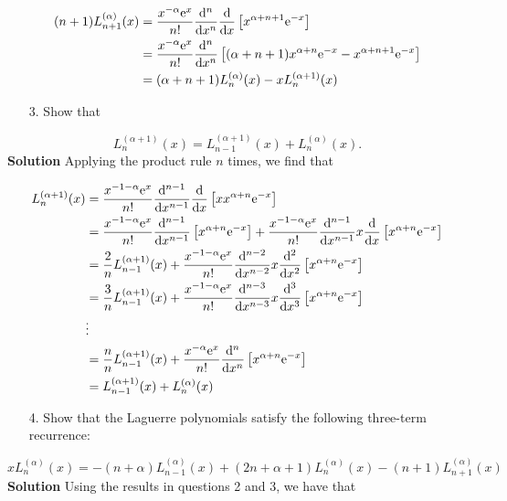 \documentclass[12pt,a4paper]{article}
\begin{document}
\begin{align*}
(n+1) L_{n+1}^{(\alpha)}(x) &= {x^{-\alpha}{\rm e}^x \over n!} {{\rm d}^{n} \over {\rm d} x^{n}} {{\rm d} \over {\rm d} x} \left[x^{\alpha+n+1} {\rm e}^{-x}\right] \\
  &= {x^{-\alpha}{\rm e}^x \over n!} {{\rm d}^{n} \over {\rm d} x^{n}}  \left[(\alpha+n+1)x^{\alpha+n} {\rm e}^{-x}-x^{\alpha+n+1} {\rm e}^{-x}\right]  \\
    &= (\alpha+n+1)L_n^{(\alpha)}(x) -   xL_n^{(\alpha+1)}(x)
\end{align*}
\begin{itemize}
\item[3. ] Show that 

\end{itemize}
\[
L_{n}^{(\alpha+1)}(x) = L_{n-1}^{(\alpha+1)}(x) + L_n^{(\alpha)}(x).
\]
\textbf{Solution} Applying the product rule $n$ times, we find that


\begin{align*}
L_{n}^{(\alpha+1)}(x) &= {x^{-1-\alpha}{\rm e}^x \over n!} {{\rm d}^{n-1} \over {\rm d} x^{n-1}} {{\rm d} \over {\rm d} x} \left[x x^{\alpha+n} {\rm e}^{-x}\right] \\
&= {x^{-1-\alpha}{\rm e}^x \over n!} {{\rm d}^{n-1} \over {\rm d} x^{n-1}} \left[ x^{\alpha+n} {\rm e}^{-x}\right]  + {x^{-1-\alpha}{\rm e}^x \over n!} {{\rm d}^{n-1} \over {\rm d} x^{n-1}} x {{\rm d} \over {\rm d} x} \left[ x^{\alpha+n} {\rm e}^{-x}\right]  \\
&= {2 \over n}L_{n-1}^{(\alpha+1)}(x)   + {x^{-1-\alpha}{\rm e}^x \over n!} {{\rm d}^{n-2} \over {\rm d} x^{n-2}} x {{\rm d}^2 \over {\rm d} x^2} \left[ x^{\alpha+n} {\rm e}^{-x}\right]  \\
&= {3 \over n}L_{n-1}^{(\alpha+1)}(x)   + {x^{-1-\alpha}{\rm e}^x \over n!} {{\rm d}^{n-3} \over {\rm d} x^{n-3}} x {{\rm d}^3 \over {\rm d} x^3} \left[ x^{\alpha+n} {\rm e}^{-x}\right]  \\
&\vdots\\
&={n \over n}L_{n-1}^{(\alpha+1)}(x)   + {x^{-\alpha}{\rm e}^x \over n!} {{\rm d}^{n} \over {\rm d} x^{n}}  \left[ x^{\alpha+n} {\rm e}^{-x}\right] \\
&=L_{n-1}^{(\alpha+1)}(x) + L_n^{(\alpha)}(x)
\end{align*}
\begin{itemize}
\item[4. ] Show that the Laguerre polynomials satisfy the following three-term recurrence:

\end{itemize}
\[
x L_n^{(\alpha)}(x) = - (n+\alpha)L_{n-1}^{(\alpha)}(x) + (2n+\alpha+1) L_n^{(\alpha)}(x) -(n+1)L_{n+1}^{(\alpha)}(x)
\]
\textbf{Solution} Using the results in questions 2 and 3, we have that
\end{document}
